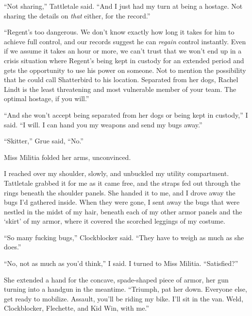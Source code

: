 ``Not sharing,'' Tattletale said.  ``And I just had my turn at being a hostage.  Not sharing the details on \emph{that} either, for the record.''



``Regent's too dangerous.  We don't know exactly how long it takes for him to achieve full control, and our records suggest he can \emph{regain} control instantly.  Even if we assume it takes an hour or more, we can't trust that we won't end up in a crisis situation where Regent's being kept in custody for an extended period and gets the opportunity to use his power on someone.  Not to mention the possibility that he could call Shatterbird to his location.  Separated from her dogs, Rachel Lindt is the least threatening and most vulnerable member of your team.  The optimal hostage, if you will.''



``And she won't accept being separated from her dogs or being kept in custody,'' I said.  ``I will.  I can hand you my weapons and send my bugs away.''



``Skitter,'' Grue said, ``No.''



Miss Militia folded her arms, unconvinced.



I reached over my shoulder, slowly, and unbuckled my utility compartment.  Tattletale grabbed it for me as it came free, and the straps fed out through the rings beneath the shoulder panels.  She handed it to me, and I drove away the bugs I'd gathered inside.  When they were gone, I sent away the bugs that were nestled in the midst of my hair, beneath each of my other armor panels and the `skirt' of my armor, where it covered the scorched leggings of my costume.



``So many fucking bugs,'' Clockblocker said.  ``They have to weigh as much as she does.''



``No, not as much as you'd think,'' I said.  I turned to Miss Militia.  ``Satisfied?''



She extended a hand for the concave, spade-shaped piece of armor, her gun turning into a handgun in the meantime.  ``Triumph, pat her down.  Everyone else, get ready to mobilize. Assault, you'll be riding my bike.  I'll sit in the van.  Weld, Clockblocker, Flechette, and Kid Win, with me.''



